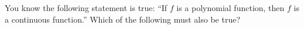 \documentclass{ximera}
\begin{document}
\begin{problem}
  You know the following statement is true: ``If $f$ is a
    polynomial function, then $f$ is a continuous function.''  Which
    of the following must also be true?
  \begin{multipleChoice}
  \end{multipleChoice}
\end{problem}
\end{document}
